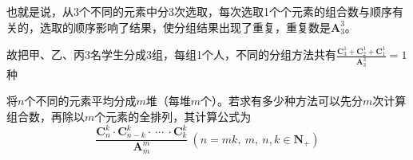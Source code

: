 也就是说，从3个不同的元素中分3次选取，每次选取1个个元素的组合数与顺序有关的，选取的顺序影响了结果，使分组结果出现了重复，重复数是$\textbf{A}_3^3$。

故把甲、乙、丙3名学生分成3组，每组1个人，不同的分组方法共有$\frac{\textbf{C}_3^{1} + \textbf{C}_2^{1} + \textbf{C}_1^{1}}{\textbf{A}_3^3}=1$种

将$n$个不同的元素平均分成$m$堆（每堆$m$个）。若求有多少种方法可以先分$m$次计算组合数，再除以$m$个元素的全排列，其计算公式为
\begin{equation}
	\frac{\textbf{C}_{n}^{k} \cdot{} \textbf{C}_{n-k}^{k} \cdot ~\cdots ~\cdot \textbf{C}_{k}^{k}}{\textbf{A}_{m}^m}~(n=mk,~m,~n,k\in{}\textbf{N}_+)
\end{equation}
